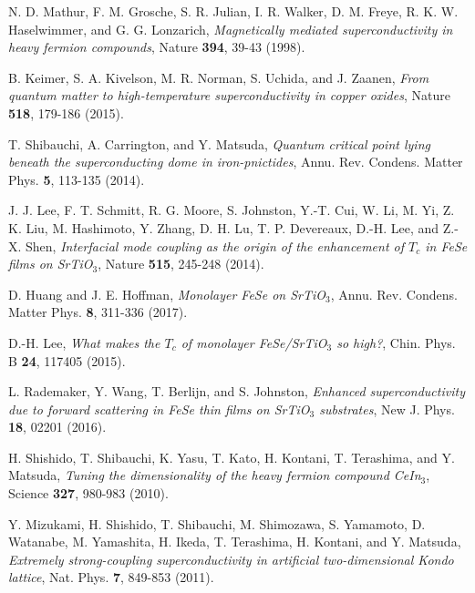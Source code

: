 \documentclass[twocolumn,preprintnumbers,amsmath,amssymb,prl]{revtex4}
\begin{document}
\begin{thebibliography}{99}


	
		N. D. Mathur, F. M. Grosche, S. R. Julian, I. R. Walker, D. M. Freye, R. K. W. Haselwimmer, and G. G. Lonzarich, 
		{\it Magnetically mediated superconductivity in heavy fermion compounds}, 
		Nature {\bf 394}, 39-43 (1998). 
	
		B. Keimer, S. A. Kivelson, M. R. Norman, S. Uchida, and J. Zaanen, 
		{\it From quantum matter to high-temperature superconductivity in copper oxides},  
		Nature {\bf 518}, 179-186 (2015). 	
		
		T. Shibauchi, A. Carrington, and Y. Matsuda, 
		{\it Quantum critical point lying beneath the superconducting dome in iron-pnictides}, 
		Annu. Rev. Condens. Matter Phys. {\bf 5}, 113-135 (2014). 	
	
		J. J. Lee, F. T. Schmitt, R. G. Moore, S. Johnston, Y.-T. Cui, W. Li, M. Yi, Z. K. Liu, M. Hashimoto, Y. Zhang, D. H. Lu, T. P. Devereaux, D.-H. Lee, and Z.-X. Shen, 
		{\it Interfacial mode coupling as the origin of the enhancement of $T_c$ in FeSe films on SrTiO$_3$}, 
		Nature {\bf 515}, 245-248 (2014). 
	
		D. Huang and J. E. Hoffman, 
		{\it Monolayer FeSe on SrTiO$_3$}, 
		Annu. Rev. Condens. Matter Phys. {\bf 8}, 311-336 (2017). 
		
		D.-H. Lee, 
		{\it What makes the $T_c$ of monolayer FeSe/SrTiO$_3$ so high?}, 
		Chin. Phys. B {\bf 24}, 117405 (2015). 
	
		L. Rademaker, Y. Wang, T. Berlijn, and S. Johnston, 
		{\it Enhanced superconductivity due to forward scattering in FeSe thin films on SrTiO$_3$ substrates}, 
		New J. Phys. {\bf 18}, 02201 (2016).
	
		H. Shishido, T. Shibauchi, K. Yasu, T. Kato, H. Kontani, T. Terashima, and Y. Matsuda, 
		{\it Tuning the dimensionality of the heavy fermion compound CeIn$_3$}, 
		Science {\bf 327}, 980-983 (2010). 
		
		Y. Mizukami, H. Shishido, T. Shibauchi, M. Shimozawa, S. Yamamoto, D. Watanabe, M. Yamashita, H. Ikeda, T. Terashima, H. Kontani, and Y. Matsuda, 
		{\it Extremely strong-coupling superconductivity in artificial two-dimensional Kondo lattice}, 
		Nat. Phys. {\bf 7}, 849-853 (2011). 
		

\end{thebibliography}
\end{document}

